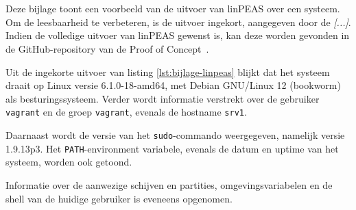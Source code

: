 
\chapter{}%
\label{ch:bijlage_linpeas}

Deze bijlage toont een voorbeeld van de uitvoer van linPEAS over een systeem.
Om de leesbaarheid te verbeteren, is de uitvoer ingekort, aangegeven door de \textit{[...]}. 
Indien de volledige uitvoer van linPEAS gewenst is, kan deze worden gevonden in de GitHub-repository van de Proof of Concept~\autocite{github-poc}.

Uit de ingekorte uitvoer van listing \ref{lst:bijlage-linpeas} blijkt dat het systeem draait op Linux versie 6.1.0-18-amd64, met Debian GNU/Linux 12 (bookworm) als besturingssysteem.
Verder wordt informatie verstrekt over de gebruiker \texttt{vagrant} en de groep \texttt{vagrant}, evenals de hostname \texttt{srv1}.

Daarnaast wordt de versie van het \texttt{sudo}-commando weergegeven, namelijk versie 1.9.13p3.
Het \texttt{PATH}-environment variabele, evenals de datum en uptime van het systeem, worden ook getoond.

Informatie over de aanwezige schijven en partities, omgevingsvariabelen en de shell van de huidige gebruiker is eveneens opgenomen.

